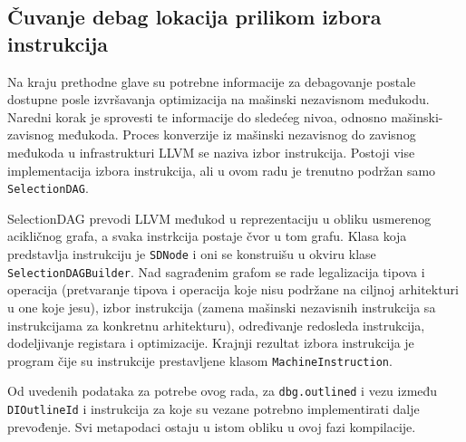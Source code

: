 \documentclass[12pt,oneside]{memoir}
\begin{document}
\subsection{Čuvanje debag lokacija prilikom izbora instrukcija}


Na kraju prethodne glave su potrebne informacije za debagovanje postale dostupne posle izvršavanja optimizacija na mašinski nezavisnom međukodu.
Naredni korak je sprovesti te informacije do sledećeg nivoa, odnosno mašinski-zavisnog međukoda.
Proces konverzije iz mašinski nezavisnog do zavisnog međukoda u infrastrukturi LLVM se naziva izbor instrukcija.
Postoji vise implementacija izbora instrukcija, ali u ovom radu je trenutno podržan samo \verb|SelectionDAG|.

SelectionDAG prevodi LLVM međukod u reprezentaciju u obliku usmerenog acikličnog grafa, a svaka instrkcija postaje čvor u tom grafu.
Klasa koja predstavlja instrukciju je \verb|SDNode| i oni se konstruišu u okviru klase \verb|SelectionDAGBuilder|.
Nad sagrađenim grafom se rade legalizacija tipova i operacija (pretvaranje tipova i operacija koje nisu podržane na ciljnoj arhitekturi u one koje jesu),
izbor instrukcija (zamena mašinski nezavisnih instrukcija sa instrukcijama za konkretnu arhitekturu), 
određivanje redosleda instrukcija, dodeljivanje registara i optimizacije.
Krajnji rezultat izbora instrukcija je program čije su instrukcije prestavljene klasom \verb|MachineInstruction|.

Od uvedenih podataka za potrebe ovog rada, za \verb|dbg.outlined| i vezu između \verb|DIOutlineId| i instrukcija za koje su vezane potrebno implementirati dalje prevođenje.
Svi metapodaci ostaju u istom obliku u ovoj fazi kompilacije.
\end{document}
